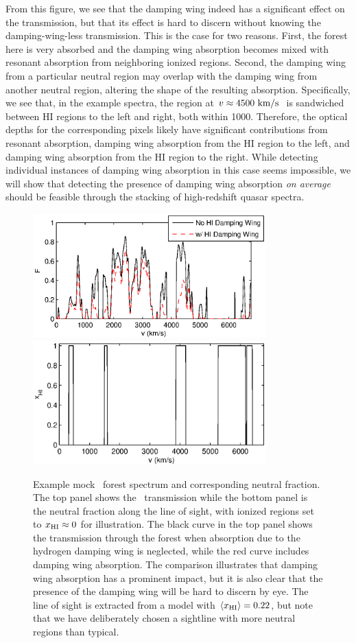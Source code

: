 From this figure, we see that the damping wing indeed has a significant effect on the transmission, but that its effect is hard to discern without knowing the damping-wing-less transmission. This is the case for two reasons. First, the forest here is very absorbed and the damping wing absorption becomes mixed with resonant absorption from neighboring ionized regions. Second, the damping wing from a particular neutral region may overlap with the damping wing from another neutral region, altering the shape of the resulting absorption. Specifically, we see that, in the example spectra, the region at $v \approx 4500\ \text{km}/\text{s}\ $ is sandwiched between HI regions to the left and right, both within 1000\kms. Therefore, the optical depths for the corresponding pixels likely have significant contributions from resonant absorption, damping wing absorption from the HI region to the left, and damping wing absorption from the HI region to the right. While detecting individual instances of damping wing absorption in this case 
seems impossible, we will show that detecting the presence of damping wing absorption \textit{on average} should be feasible through the stacking of high-redshift quasar spectra.

\begin{figure}[h]
  \centering
  \includegraphics[width=9cm]{fig1a.eps}
  \includegraphics[width=9cm]{fig1b.eps}
  \caption{Example mock \lya\ forest spectrum and corresponding neutral fraction. The top panel shows the \lya\ transmission while the bottom panel is the neutral fraction along the line of sight, with ionized regions set to $x_{\rm HI} \approx 0$ for illustration. The black curve in the top panel shows the transmission through the forest when absorption due to the hydrogen damping wing is neglected, while the red curve includes damping wing  absorption. The comparison illustrates that damping wing absorption has a prominent impact, but it is also clear that the presence of the damping wing will be hard to discern by eye. The line of sight is extracted from a model with $\langle x_{\text{HI}}\rangle = 0.22$, but note that we have deliberately chosen a sightline with more neutral regions than typical.}
  \label{fig:ExampleSpectraA}
\end{figure}





